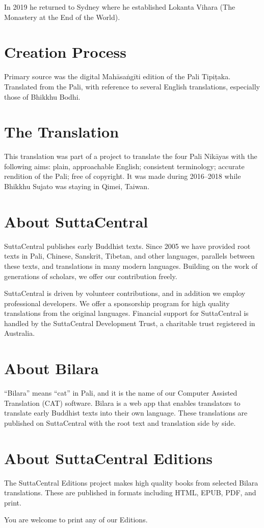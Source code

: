 \documentclass[12pt,openany]{book}%
\begin{document}
In 2019 he returned to Sydney where he established Lokanta Vihara (The Monastery at the End of the World). 

\section*{Creation Process}

Primary source was the digital \textsanskrit{Mahāsaṅgīti} edition of the Pali \textsanskrit{Tipiṭaka}. Translated from the Pali, with reference to several English translations, especially those of Bhikkhu Bodhi.

\section*{The Translation}

This translation was part of a project to translate the four Pali \textsanskrit{Nikāyas} with the following aims: plain, approachable English; consistent terminology; accurate rendition of the Pali; free of copyright. It was made during 2016–2018 while Bhikkhu Sujato was staying in Qimei, Taiwan.

\section*{About SuttaCentral}

SuttaCentral publishes early Buddhist texts. Since 2005 we have provided root texts in Pali, Chinese, Sanskrit, Tibetan, and other languages, parallels between these texts, and translations in many modern languages. Building on the work of generations of scholars, we offer our contribution freely.

SuttaCentral is driven by volunteer contributions, and in addition we employ professional developers. We offer a sponsorship program for high quality translations from the original languages. Financial support for SuttaCentral is handled by the SuttaCentral Development Trust, a charitable trust registered in Australia.

\section*{About Bilara}

“Bilara” means “cat” in Pali, and it is the name of our Computer Assisted Translation (CAT) software. Bilara is a web app that enables translators to translate early Buddhist texts into their own language. These translations are published on SuttaCentral with the root text and translation side by side.

\section*{About SuttaCentral Editions}

The SuttaCentral Editions project makes high quality books from selected Bilara translations. These are published in formats including HTML, EPUB, PDF, and print.

You are welcome to print any of our Editions.

%
\end{document}
